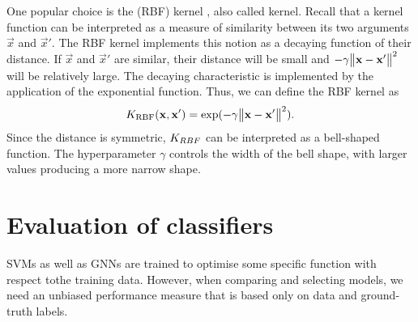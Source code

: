 \documentclass[
	fontsize=10pt, %
	twoside=false, %
	secnumdepth=1, %
  toc=indentunnumbered %
]{kaobook}
\begin{document}
One popular choice is the  (RBF) kernel
, also called  kernel. Recall that a kernel function can be
interpreted as a measure of similarity between its two arguments $\vec x$ and
$\vec x'$. The RBF kernel implements this notion as a decaying function of their
distance. If $\vec x$ and $\vec x'$ are similar, their distance will be small and $-
\gamma \norm{\mathbf{x} - \mathbf{x}'}^2$ will be relatively large. The decaying
characteristic is implemented by the application of the exponential function.
Thus, we can define the RBF kernel as
\begin{align}
  K_{\text{RBF}} (\mathbf{x}, \mathbf{x}') = \exp( -\gamma \norm{\mathbf{x} - \mathbf{x}'}^2 ).
  \label{eq:rbf-kernel}
\end{align}
Since the distance is symmetric, $K_{RBF}$ can be interpreted as a bell-shaped
function.
The hyperparameter $\gamma$ controls the width of the bell shape, with
larger values producing a more narrow shape. 




\section{Evaluation of classifiers}

SVMs as well as GNNs are trained to optimise some specific function with respect
tothe training data. However, when comparing and selecting models, we need an
unbiased performance measure that is based only on data and ground-truth labels.
\end{document}
